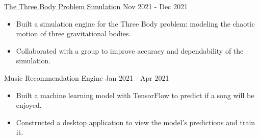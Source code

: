\documentclass[9pt]{resume}
\begin{document}
\begin{experiencelist}
        \experiencenocompany
            {\href{https://github.com/TheSharkhead2/third_body_simulation}{The Three Body Problem Simulation}}
            {Nov 2021 - Dec 2021}
            {\begin{itemize}[noitemsep, topsep=1pt]
                \item Built a simulation engine for the Three Body problem: modeling the chaotic motion of three gravitational bodies. 
                \item Collaborated with a group to improve accuracy and dependability of the simulation.
            \end{itemize}}
        \experiencenocompany
            {Music Recommendation Engine}
            {Jan 2021 - Apr 2021}
            {\begin{itemize}[noitemsep, topsep=1pt]
                \item Built a machine learning model with TensorFlow to predict if a song will be enjoyed.
                \item Constructed a desktop application to view the model's predictions and train it.
            \end{itemize}}
    \end{experiencelist}
    \vspace{-0.2cm}
\end{document}
